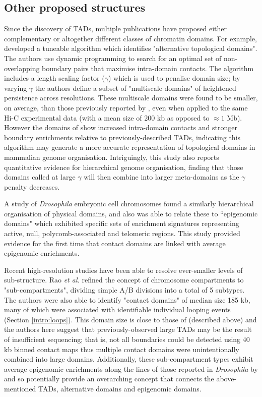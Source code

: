 \documentclass[a4paper,11pt,oneside]{book}
\begin{document}
\subsection{Other proposed structures}

Since the discovery of TADs, multiple publications have proposed either complementary or altogether different classes of chromatin domains. For example, \citet{Filippova2014} developed a tuneable algorithm which identifies "alternative topological domains". The authors use dynamic programming to search for an optimal set of non-overlapping boundary pairs that maximise intra-domain contacts. The algorithm includes a length scaling factor ($\gamma$) which is used to penalise domain size; by varying $\gamma$ the authors define a subset of "multiscale domains" of heightened persistence across resolutions.\cite{Filippova2014} These multiscale domains were found to be smaller, on average, than those previously reported by \citet{Dixon2012}, even when applied to the same Hi-C experimental data (with a mean size of 200 kb as opposed to $\approx 1$ Mb). However the domains of \citet{Filippova2014} show increased intra-domain contacts and stronger boundary enrichments relative to previously-described TADs, indicating this algorithm may generate a more accurate representation of topological domains in mammalian genome organisation. Intriguingly, this study also reports quantitative evidence for hierarchical genome organisation, finding that those domains called at large $\gamma$ will then combine into larger meta-domains as the $\gamma$ penalty decreases.\cite{Filippova2014}

A study of \emph{Drosophila} embryonic cell chromosomes found a similarly hierarchical organisation of physical domains, and also was able to relate these to ``epigenomic domains" which exhibited specific sets of enrichment signatures representing active, null, polycomb-associated and telomeric regions.\cite{Sexton2012} This study provided evidence for the first time that contact domains are linked with average epigenomic enrichments.

Recent high-resolution studies have been able to resolve ever-smaller levels of sub-structure. Rao \emph{et al.}\cite{Rao2014} refined the concept of chromosome compartments to "sub-compartments", dividing simple A/B divisions into a total of 5 subtypes. The authors were also able to identify "contact domains" of median size 185 kb, many of which were associated with identifiable individual looping events (Section \ref{intro:loops}).\cite{Rao2014} This domain size is close to those of \citet{Filippova2014} (described above) and the authors here suggest that previously-observed large TADs may be the result of insufficient sequencing; that is, not all boundaries could be detected using 40 kb binned contact maps thus multiple contact domains were unintentionally combined into large domains. Additionally, these sub-compartment types exhibit average epigenomic enrichments along the lines of those reported in \emph{Drosophila} by \citet{Sexton2012} and so potentially provide an overarching concept that connects the above-mentioned TADs, alternative domains and epigenomic domains.
\end{document}
